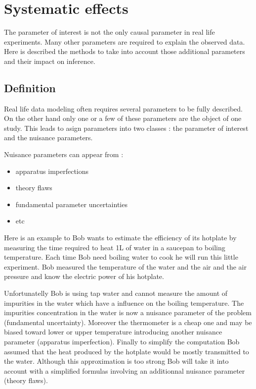 \section{Systematic effects} %
\label{sec:systematic_effects}


The parameter of interest is not the only causal parameter in real life experiments.
Many other parameters are required to explain the observed data.
Here is described the methods to take into account those additional parameters and their impact on inference. 





\subsection{Definition} %
\label{sub:definition}

Real life data modeling often requires several parameters to be fully described.
On the other hand only one or a few of these parameters are the object of one study.
This leads to asign parameters into two classes : the parameter of interest and the nuisance parameters.

Nuisance parameters can appear from :
\begin{itemize}
	\item apparatus imperfections
	\item theory flaws
	\item fundamental parameter uncertainties
	\item etc
\end{itemize}

Here is an example to 
Bob wants to estimate the efficiency of its hotplate by measuring the time required to heat 1L of water in a saucepan to boiling temperature.
Each time Bob need boiling water to cook he will run this little experiment.
Bob measured the temperature of the water and the air and the air pressure and know the electric power of his hotplate.

Unfortunatelly Bob is using tap water and cannot measure the amount of impurities in the water which have a influence on the boiling temperature.
The impurities concentration in the water is now a nuisance parameter of the problem (fundamental uncertainty).
Moreover the thermometer is a cheap one and may be biased toward lower or upper temperature introducing another nuisance parameter (apparatus imperfection).
Finally to simplify the computation Bob assumed that the heat produced by the hotplate would be mostly transmitted to the water.
Although this approximation is too strong Bob will take it into account with a simplified formulas involving an additionnal nuisance parameter (theory flaws).

